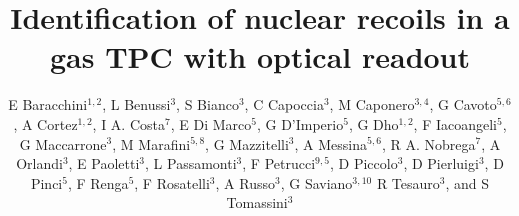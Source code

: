 \documentclass[12pt]{iopart}
\begin{document}
\title[]{Identification of  nuclear recoils in a gas TPC with optical readout}

\newcommand {\ie}{\mbox{i.e.}\xspace}     %
\newcommand {\eg}{\mbox{e.g.}\xspace}     %

\newcommand{\fe}{\ensuremath{^{55}\textrm{Fe}}\xspace}
\newcommand{\abs}[1]{\ensuremath{\vert #1 \vert}}
\newcommand{\ambe}{\ensuremath{\textrm{Am} \textrm{Be}}\xspace}
\newcommand{\isclu}{\ensuremath{I_{SC}}\xspace}
\newcommand{\tsigmag}{\ensuremath{\sigma^T_{Gauss}}\xspace}
\newcommand{\dedl}{\ensuremath{\frac{dE}{dl_p}}\xspace}

\newcommand{\lemon}{{\textsc{Lemon}}\xspace}
\newcommand{\cygno}{{\textsc{Cygno}}\xspace}
\newcommand{\idbscan}{{\textsc{Idbscan}}\xspace}
\newcommand{\dbscan}{{\textsc{dbscan}}\xspace}
\newcommand{\gac}{{\textsc{Gac}}\xspace}
\newcommand{\nnc}{{\textsc{Nnc}}\xspace}
\newcommand{\GEANTfour} {{\textsc{Geant4}}\xspace}
\newcommand{\SRIM} {{\textsc{Srim}}\xspace}
\newcommand{\garfield} {{\textsc{Garfield}}\xspace}
\newcommand{\PYTHONthree} {{\textsc{Python3}}\xspace}
\newcommand{\ROOT} {{\textsc{Root6}}\xspace}

\newcommand{\unit}[1]{\ensuremath{\textrm{\,#1}}\xspace}
\newcommand{\keV}{\ensuremath{\,\textrm{ke\hspace{-.08em}V}}\xspace}
\newcommand{\MeV}{\ensuremath{\,\textrm{Me\hspace{-.08em}V}}\xspace}




\author{E Baracchini$^{1,2}$,
L Benussi$^{3}$,
S Bianco$^{3}$,
C Capoccia$^{3}$, 
M Caponero$^{3,4}$,
G Cavoto$^{5,6}$,
A Cortez$^{1,2}$,
I A. Costa$^{7}$,
E Di Marco$^{5}$,
G D'Imperio$^{5}$,
G Dho$^{1,2}$,
F Iacoangeli$^{5}$,
G Maccarrone$^{3}$,
M Marafini$^{5,8}$,
G Mazzitelli$^{3}$,
A Messina$^{5,6}$,
R A. Nobrega$^{7}$,
A Orlandi$^{3}$,
E Paoletti$^{3}$,
L Passamonti$^{3}$,
F Petrucci$^{9,5}$,
D Piccolo$^{3}$,
D Pierluigi$^{3}$,
D Pinci$^{5}$,
F Renga$^{5}$,
F Rosatelli$^{3}$,
A Russo$^{3}$,
G Saviano$^{3,10}$
R Tesauro$^{3}$,
and S Tomassini$^{3}$}

\address{$^1$Gran~Sasso~Science~Institute, L'Aquila, Italy}
\address{$^2$INFN, Laboratori Nazionali del Gran Sasso, Assergi, Italy}
\address{$^3$INFN, Laboratori Nazionali di Frascati, Frascati, Italy}
\address{$^4$ENEA Centro Ricerche Frascati, Frascati, Italy}
\address{$^5$INFN, Sezione di Roma, Roma, Italy}
\address{$^6$Dipartimento di Fisica, Sapienza Universit\`a di Roma, Roma, Italy}
\address{$^7$Universidade Federal de Juiz de Fora, Juiz de Fora, Brasil}
\address{$^8$Museo Storico della Fisica e Centro Studi e Ricerche ``Enrico Fermi'', Roma, Italy}
\address{$^9$Dipartimento di Matematica e Fisica, Universit\`a Roma TRE, Roma, Italy}
\address{$^{10}$Dipartimento di Ingegneria Chimica, Materiali e Ambiente, Sapienza Universit\`a di Roma, Roma, Italy}
\end{document}

